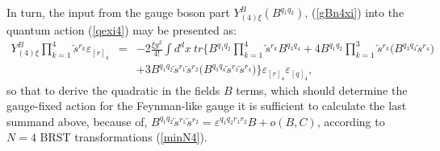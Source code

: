 \documentclass[10pt]{article}
\begin{document}
  In turn, the input from the gauge boson part $Y^B_{(4)\xi}(B^{q_1q_2})$, (\ref{gBn4xi}) into the quantum action (\ref{qexi4})  may be presented as:
  \begin{eqnarray}\label{yb4pres}
    Y^B_{(4)\xi} \prod_{k=1}^4\overleftarrow{s}{}^{r_k}\varepsilon_{[r]_4}& =& - 2 \frac{\xi g^2}{4!} \int d^dx \ tr \Big\{B^{q_1q_2}\prod_{k=1}^4\overleftarrow{s}{}^{r_k}B^{q_3q_4}+ 4B^{q_1q_2}\prod_{k=1}^3\overleftarrow{s}{}^{r_k}\big(B^{q_3q_4} \overleftarrow{s}{}^{r_4}\big) \nonumber\\
    &&  +3B^{q_1q_2}\overleftarrow{s}{}^{r_1}\overleftarrow{s}{}^{r_2}\big(B^{q_3q_4} \overleftarrow{s}{}^{r_3}\overleftarrow{s}{}^{r_4}\big)\Big\}\varepsilon_{[r]_4}\varepsilon_{[q]_4},
  \end{eqnarray}
  so that to derive the quadratic in the fields $B$  terms, which should determine  the gauge-fixed action for the Feynman-like gauge it is sufficient to calculate the last  summand above, because of, $B^{q_1q_2}\overleftarrow{s}{}^{r_1}\overleftarrow{s}{}^{r_2} = \varepsilon^{q_1q_2r_1r_2}B + o (B,C)$, according to $N=4$ BRST transformations (\ref{minN4}).
\end{document}
